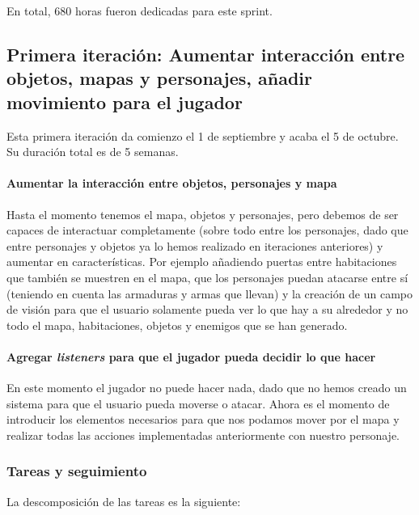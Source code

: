 En total, 680 horas fueron dedicadas para este sprint.

\subsection{Primera iteración: Aumentar interacción entre objetos, mapas y personajes, añadir movimiento para el jugador}

Esta primera iteración da comienzo el 1 de septiembre y acaba el 5 de octubre. Su duración total es de 5 semanas.

\paragraph{Aumentar la interacción entre objetos, personajes y mapa} Hasta el momento tenemos el mapa, objetos y personajes, pero debemos de ser capaces de interactuar completamente (sobre todo entre los personajes, dado que entre personajes y objetos ya lo hemos realizado en iteraciones anteriores) y aumentar en características. Por ejemplo añadiendo puertas entre habitaciones que también se muestren en el mapa, que los personajes puedan atacarse entre sí (teniendo en cuenta las armaduras y armas que llevan) y la creación de un campo de visión para que el usuario solamente pueda ver lo que hay a su alrededor y no todo el mapa, habitaciones, objetos y enemigos que se han generado.

\paragraph{Agregar \textit{listeners} para que el jugador pueda decidir lo que hacer} En este momento el jugador no puede hacer nada, dado que no hemos creado un sistema para que el usuario pueda moverse o atacar. Ahora es el momento de introducir los elementos necesarios para que nos podamos mover por el mapa y realizar todas las acciones implementadas anteriormente con nuestro personaje.

\subsubsection{Tareas y seguimiento}

La descomposición de las tareas es la siguiente:

